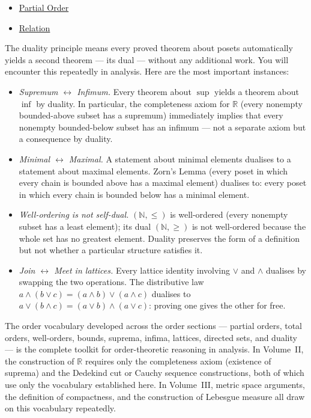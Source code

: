 \begin{dependencies}
\begin{itemize}
  \item \hyperref[def:partial-order]{Partial Order}
  \item \hyperref[def:relation]{Relation}
\end{itemize}
\end{dependencies}

\begin{remark*}
\label{rem:duality-pairs}
The duality principle means every proved theorem about posets automatically
yields a second theorem — its dual — without any additional work.  You will
encounter this repeatedly in analysis.  Here are the most important instances:
\begin{itemize}
  \item \emph{Supremum $\leftrightarrow$ Infimum.}  Every theorem about
        $\sup$ yields a theorem about $\inf$ by duality.  In particular,
        the completeness axiom for $\mathbb{R}$ (every nonempty bounded-above
        subset has a supremum) immediately implies that every nonempty
        bounded-below subset has an infimum — not a separate axiom but a
        consequence by duality.
  \item \emph{Minimal $\leftrightarrow$ Maximal.}  A statement about minimal
        elements dualises to a statement about maximal elements.  Zorn's Lemma
        (every poset in which every chain is bounded above has a maximal
        element) dualises to: every poset in which every chain is bounded below
        has a minimal element.
  \item \emph{Well-ordering is not self-dual.}
        $(\mathbb{N}, \leq)$ is well-ordered (every nonempty subset has a
        least element); its dual $(\mathbb{N}, \geq)$ is not well-ordered
        because the whole set has no greatest element.  Duality preserves
        the form of a definition but not whether a particular structure
        satisfies it.
  \item \emph{Join $\leftrightarrow$ Meet in lattices.}  Every lattice identity
        involving $\vee$ and $\wedge$ dualises by swapping the two operations.
        The distributive law $a \wedge (b \vee c) = (a \wedge b) \vee
        (a \wedge c)$ dualises to $a \vee (b \wedge c) =
        (a \vee b) \wedge (a \vee c)$: proving one gives the other for free.
\end{itemize}
\end{remark*}

\begin{remark*}[Transition]
\label{rem:hasse-transition}
The order vocabulary developed across the order sections — partial orders,
total orders, well-orders, bounds, suprema, infima, lattices, directed sets,
and duality — is the complete toolkit for order-theoretic reasoning in analysis.
In Volume~II, the construction of $\mathbb{R}$ requires only the completeness
axiom (existence of suprema) and the Dedekind cut or Cauchy sequence
constructions, both of which use only the vocabulary established here.  In
Volume~III, metric space arguments, the definition of compactness, and the
construction of Lebesgue measure all draw on this vocabulary repeatedly.
\end{remark*}
